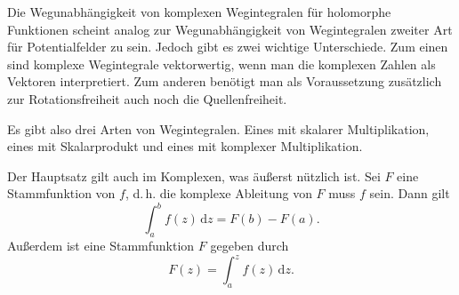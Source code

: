 \documentclass[a4paper,10pt,fleqn,twocolumn,twoside]{article}
\numberwithin{equation}{section}
\begin{document}
Die Wegunabhängigkeit von komplexen Wegintegralen für holomorphe
Funktionen scheint analog zur Wegunabhängigkeit von Wegintegralen
zweiter Art für Potentialfelder zu sein. Jedoch gibt es zwei wichtige
Unterschiede. Zum einen sind komplexe Wegintegrale vektorwertig, wenn
man die komplexen Zahlen als Vektoren interpretiert. Zum anderen
benötigt man als Voraussetzung zusätzlich zur Rotationsfreiheit
auch noch die Quellenfreiheit.

Es gibt also drei Arten von Wegintegralen. Eines mit skalarer
Multiplikation, eines mit Skalarprodukt und eines mit komplexer
Multiplikation.

Der Hauptsatz gilt auch im Komplexen, was äußerst
nützlich ist. Sei $F$ eine Stammfunktion von $f$, d.\,h. die
komplexe Ableitung von $F$ muss $f$ sein. Dann gilt
\begin{equation}
\int_a^b f(z)\,\mathrm dz = F(b)-F(a).
\end{equation}
Außerdem ist eine Stammfunktion $F$ gegeben durch
\begin{equation}
F(z) = \int_a^z f(z)\,\mathrm dz.
\end{equation}
\end{document}
